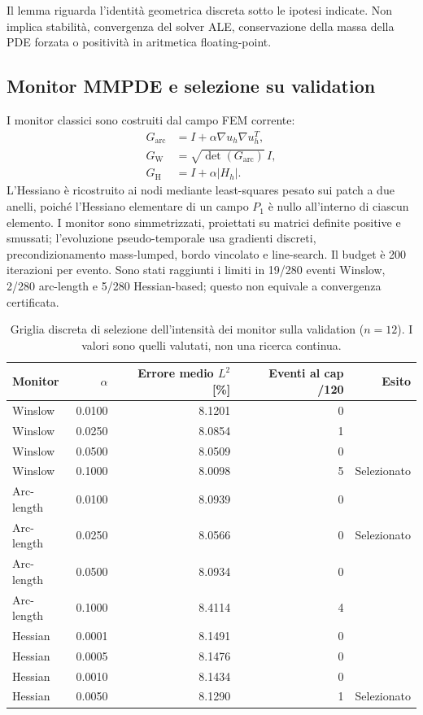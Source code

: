 Il lemma riguarda l'identità geometrica discreta sotto le ipotesi indicate. Non implica stabilità, convergenza del solver ALE, conservazione della massa della PDE forzata o positività in aritmetica floating-point.

\subsection{Monitor MMPDE e selezione su validation}

I monitor classici sono costruiti dal campo FEM corrente:
\begin{align}
G_{\mathrm{arc}}&=I+\alpha\nabla u_h\nabla u_h^T,\\
G_{\mathrm{W}}&=\sqrt{\det(G_{\mathrm{arc}})}\,I,\\
G_{\mathrm{H}}&=I+\alpha|H_h|.
\end{align}
L'Hessiano è ricostruito ai nodi mediante least-squares pesato sui patch a due anelli, poiché l'Hessiano elementare di un campo $P_1$ è nullo all'interno di ciascun elemento. I monitor sono simmetrizzati, proiettati su matrici definite positive e smussati; l'evoluzione pseudo-temporale usa gradienti discreti, precondizionamento mass-lumped, bordo vincolato e line-search. Il budget è 200 iterazioni per evento. Sono stati raggiunti i limiti in 19/280 eventi Winslow, 2/280 arc-length e 5/280 Hessian-based; questo non equivale a convergenza certificata.

\begin{table}[!t]
\centering\small
\caption{Griglia discreta di selezione dell'intensità dei monitor sulla validation ($n=12$). I valori sono quelli valutati, non una ricerca continua.}
\label{tab:f1_alpha_validation}
\begin{tabular*}{\textwidth}{@{\extracolsep{\fill}}lrrrr}
\toprule
Monitor & $\alpha$ & Errore medio $L^2$ [\%] & Eventi al cap /120 & Esito\\
\midrule
Winslow & 0.0100 & 8.1201 & 0 & \\
Winslow & 0.0250 & 8.0854 & 1 & \\
Winslow & 0.0500 & 8.0509 & 0 & \\
Winslow & 0.1000 & 8.0098 & 5 & Selezionato\\
\midrule
Arc-length & 0.0100 & 8.0939 & 0 & \\
Arc-length & 0.0250 & 8.0566 & 0 & Selezionato\\
Arc-length & 0.0500 & 8.0934 & 0 & \\
Arc-length & 0.1000 & 8.4114 & 4 & \\
\midrule
Hessian & 0.0001 & 8.1491 & 0 & \\
Hessian & 0.0005 & 8.1476 & 0 & \\
Hessian & 0.0010 & 8.1434 & 0 & \\
Hessian & 0.0050 & 8.1290 & 1 & Selezionato\\
\bottomrule
\end{tabular*}
\end{table}

